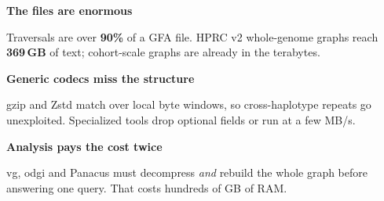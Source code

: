 \documentclass[final,t]{beamer}
\newcommand{\code}[1]{{\ttfamily #1}}
\begin{document}
\begin{frame}[t,fragile]
\begin{center}
\begin{minipage}{0.945\paperwidth}
  \begin{minipage}[t]{0.315\linewidth}
    {\large\bfseries\color{cherry}The files are enormous}\\[0.18cm]
    {\normalsize\color{slate}\raggedright
     Traversals are over \textbf{90\%} of a GFA file. HPRC v2 whole-genome graphs
     reach \textbf{369\,GB} of text; cohort-scale graphs are already in the
     terabytes.\par}
  \end{minipage}\hfill
  \begin{minipage}[t]{0.315\linewidth}
    {\large\bfseries\color{cherry}Generic codecs miss the structure}\\[0.18cm]
    {\normalsize\color{slate}\raggedright
     gzip and Zstd match over local byte windows, so cross-haplotype repeats go
     unexploited. Specialized tools drop optional fields or run at a few MB/s.\par}
  \end{minipage}\hfill
  \begin{minipage}[t]{0.315\linewidth}
    {\large\bfseries\color{cherry}Analysis pays the cost twice}\\[0.18cm]
    {\normalsize\color{slate}\raggedright
     \code{vg}, \code{odgi} and Panacus must decompress \emph{and} rebuild the whole
     graph before answering one query. That costs hundreds of GB of RAM.\par}
  \end{minipage}
\end{minipage}
\end{center}

\vspace{0.48cm}


\end{frame}
\end{document}
